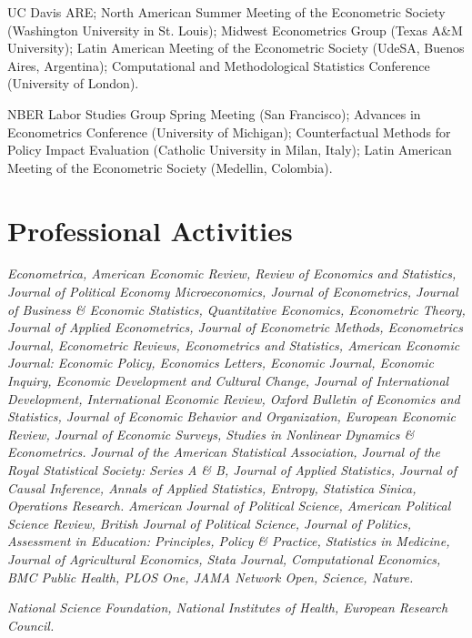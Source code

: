 \documentclass[11pt]{article}
\let\cvsection\section
\renewcommand{\section}{\Needspace{8\baselineskip}\cvsection}
\newcommand{\subhead}[1]{\Needspace{5\baselineskip}\vspace{7pt}{\sffamily\footnotesize\bfseries\color{ink}#1}\par\vspace{1pt}}
\newcommand{\yr}[1]{{\sffamily\footnotesize\color{muted}#1}}
\begin{document}
\begin{yrlist}
\item[\yr{2017}] UC Davis ARE; North American Summer Meeting of the Econometric Society (Washington University in St. Louis); Midwest Econometrics Group (Texas A\&M University); Latin American Meeting of the Econometric Society (UdeSA, Buenos Aires, Argentina); Computational and Methodological Statistics Conference (University of London).
\item[\yr{2016}] NBER Labor Studies Group Spring Meeting (San Francisco); Advances in Econometrics Conference (University of Michigan); Counterfactual Methods for Policy Impact Evaluation (Catholic University in Milan, Italy); Latin American Meeting of the Econometric Society (Medellin, Colombia).
\end{yrlist} 
  


\section{Professional Activities}


	\subhead{Journal Referee}
	\emph{Econometrica, American Economic Review, Review of Economics and Statistics, Journal of Political Economy Microeconomics, Journal of Econometrics, Journal of Business \& Economic Statistics, Quantitative Economics, Econometric Theory, Journal of Applied Econometrics, Journal of Econometric Methods, Econometrics Journal, Econometric Reviews, Econometrics and Statistics, American Economic Journal: Economic Policy, Economics Letters, Economic Journal, Economic Inquiry, Economic Development and Cultural Change, Journal of International Development, International Economic Review, Oxford Bulletin of Economics and Statistics, Journal of Economic Behavior and Organization, European Economic Review, Journal of Economic Surveys, Studies in Nonlinear Dynamics \& Econometrics.} \emph{Journal of the American Statistical Association, Journal of the Royal Statistical Society: Series A \& B, Journal of Applied Statistics, Journal of Causal Inference, Annals of Applied Statistics, Entropy, Statistica Sinica, Operations Research.} \emph{American Journal of Political Science, American Political Science Review, British Journal of Political Science, Journal of Politics, Assessment in Education: Principles, Policy \& Practice, Statistics in Medicine, Journal of Agricultural Economics, Stata Journal, Computational Economics, BMC Public Health, PLOS One, JAMA Network Open, Science, Nature.}

	\subhead{Grant Reviewer}
	\emph{National Science Foundation, National Institutes of Health, European Research Council.}
\end{document}

